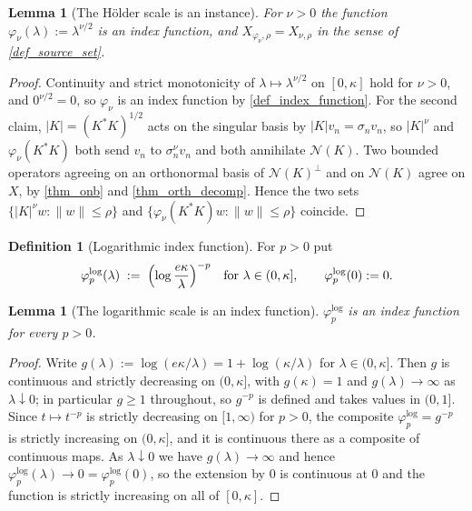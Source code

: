 \documentclass[a4paper]{report}
\theoremstyle{plain}
\newtheorem{lemma}[theorem]{Lemma}
\theoremstyle{definition}
\newtheorem{definition}[theorem]{Definition}
\theoremstyle{remark}
\newcommand{\Ker}{\mathcal{N}}
\begin{document}
\begin{lemma}[The H\"older scale is an instance]
  \label{lem_holder_is_index}
  For $\nu > 0$ the function $\varphi_{\nu}(\lambda) := \lambda^{\nu/2}$ is an index
  function, and $X_{\varphi_{\nu},\rho} = X_{\nu,\rho}$ in the sense of
  \cref{def_source_set}.
\end{lemma}
\begin{proof}
  Continuity and strict monotonicity of $\lambda \mapsto \lambda^{\nu/2}$ on $[0,\kappa]$
  hold for $\nu > 0$, and $0^{\nu/2} = 0$, so $\varphi_{\nu}$ is an index function by
  \cref{def_index_function}.  For the second claim, $|K| = (K^{*}K)^{1/2}$ acts on the
  singular basis by $|K|v_n = \sigma_n v_n$, so $|K|^{\nu}$ and $\varphi_{\nu}(K^{*}K)$
  both send $v_n$ to $\sigma_n^{\nu}v_n$ and both annihilate $\Ker(K)$.  Two bounded
  operators agreeing on an orthonormal basis of $\Ker(K)^{\perp}$ and on $\Ker(K)$ agree
  on $X$, by \cref{thm_onb} and \cref{thm_orth_decomp}.  Hence the two sets
  $\{|K|^{\nu}w : \|w\| \le \rho\}$ and $\{\varphi_{\nu}(K^{*}K)w : \|w\| \le \rho\}$
  coincide.
\end{proof}


\begin{definition}[Logarithmic index function]
  \label{def_log_index}
  For $p > 0$ put
  \[
    \varphi^{\log}_{p}(\lambda) \;:=\;
      \Bigl(\log\frac{e\kappa}{\lambda}\Bigr)^{-p}
      \quad \text{for } \lambda \in (0,\kappa],
    \qquad \varphi^{\log}_{p}(0) := 0 .
  \]
\end{definition}


\begin{lemma}[The logarithmic scale is an index function]
  \label{lem_log_is_index}
  $\varphi^{\log}_{p}$ is an index function for every $p > 0$.
\end{lemma}
\begin{proof}
  Write $g(\lambda) := \log(e\kappa/\lambda) = 1 + \log(\kappa/\lambda)$ for
  $\lambda \in (0,\kappa]$.  Then $g$ is continuous and strictly decreasing on
  $(0,\kappa]$, with $g(\kappa) = 1$ and $g(\lambda) \to \infty$ as
  $\lambda \downarrow 0$; in particular $g \ge 1$ throughout, so $g^{-p}$ is defined and
  takes values in $(0,1]$.  Since $t \mapsto t^{-p}$ is strictly decreasing on
  $[1,\infty)$ for $p > 0$, the composite $\varphi^{\log}_p = g^{-p}$ is strictly
  increasing on $(0,\kappa]$, and it is continuous there as a composite of continuous
  maps.  As $\lambda \downarrow 0$ we have $g(\lambda) \to \infty$ and hence
  $\varphi^{\log}_p(\lambda) \to 0 = \varphi^{\log}_p(0)$, so the extension by $0$ is
  continuous at $0$ and the function is strictly increasing on all of $[0,\kappa]$.
\end{proof}
\end{document}
